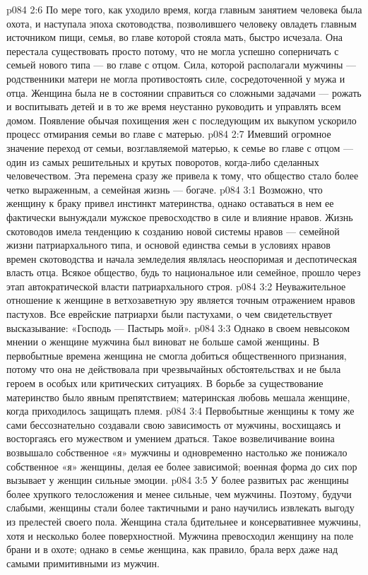 \vs p084 2:6 По мере того, как уходило время, когда главным занятием человека была охота, и наступала эпоха скотоводства, позволившего человеку овладеть главным источником пищи, семья, во главе которой стояла мать, быстро исчезала. Она перестала существовать просто потому, что не могла успешно соперничать с семьей нового типа --- во главе с отцом. Сила, которой располагали мужчины --- родственники матери не могла противостоять силе, сосредоточенной у мужа и отца. Женщина была не в состоянии справиться со сложными задачами --- рожать и воспитывать детей и в то же время неустанно руководить и управлять всем домом. Появление обычая похищения жен с последующим их выкупом ускорило процесс отмирания семьи во главе с матерью.
\vs p084 2:7 Имевший огромное значение переход от семьи, возглавляемой матерью, к семье во главе с отцом --- один из самых решительных и крутых поворотов, когда\hyp{}либо сделанных человечеством. Эта перемена сразу же привела к тому, что общество стало более четко выраженным, а семейная жизнь --- богаче.
\vs p084 3:1 Возможно, что женщину к браку привел инстинкт материнства, однако оставаться в нем ее фактически вынуждали мужское превосходство в силе и влияние нравов. Жизнь скотоводов имела тенденцию к созданию новой системы нравов --- семейной жизни патриархального типа, и основой единства семьи в условиях нравов времен скотоводства и начала земледелия являлась неоспоримая и деспотическая власть отца. Всякое общество, будь то национальное или семейное, прошло через этап автократической власти патриархального строя.
\vs p084 3:2 Неуважительное отношение к женщине в ветхозаветную эру является точным отражением нравов пастухов. Все еврейские патриархи были пастухами, о чем свидетельствует высказывание: «Господь --- Пастырь мой».
\vs p084 3:3 Однако в своем невысоком мнении о женщине мужчина был виноват не больше самой женщины. В первобытные времена женщина не смогла добиться общественного признания, потому что она не действовала при чрезвычайных обстоятельствах и не была героем в особых или критических ситуациях. В борьбе за существование материнство было явным препятствием; материнская любовь мешала женщине, когда приходилось защищать племя.
\vs p084 3:4 Первобытные женщины к тому же сами бессознательно создавали свою зависимость от мужчины, восхищаясь и восторгаясь его мужеством и умением драться. Такое возвеличивание воина возвышало собственное «я» мужчины и одновременно настолько же понижало собственное «я» женщины, делая ее более зависимой; военная форма до сих пор вызывает у женщин сильные эмоции.
\vs p084 3:5 У более развитых рас женщины более хрупкого телосложения и менее сильные, чем мужчины. Поэтому, будучи слабыми, женщины стали более тактичными и рано научились извлекать выгоду из прелестей своего пола. Женщина стала бдительнее и консервативнее мужчины, хотя и несколько более поверхностной. Мужчина превосходил женщину на поле брани и в охоте; однако в семье женщина, как правило, брала верх даже над самыми примитивными из мужчин.
